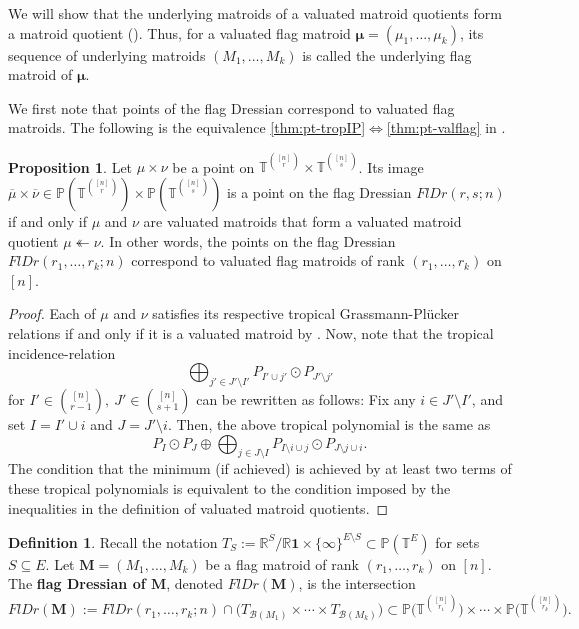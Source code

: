 \documentclass[11pt]{amsart}
\newcommand{\RR}{\mathbb R}
\newcommand{\PP}{\mathbb P}
\newcommand{\TT}{\mathbb T}
\newcommand{\MM}{{\boldsymbol M}}
\theoremstyle{definition}
\newtheorem{prop}[thm]{Proposition}
\newtheorem{defn}[thm]{Definition}
\begin{document}
\medskip
We will show that the underlying matroids of a valuated matroid quotients form a matroid quotient ().  Thus, for a valuated flag matroid $\boldsymbol{\mu} = (\mu_1, \ldots, \mu_k)$, its sequence of underlying matroids $(M_1, \ldots, M_k)$ is called the underlying flag matroid of $\boldsymbol\mu$.

\medskip
We first note that points of the flag Dressian correspond to valuated flag matroids.  The following is the equivalence \ref{thm:pt-tropIP}$\iff$\ref{thm:pt-valflag} in .


\begin{prop}\label{prop:FlDr=valflagmat}
Let $\mu \times \nu$ be a point on $\TT^{\binom{[n]}{r}} \times \TT^{\binom{[n]}{s}}$.  Its image $\overline\mu\times \overline\nu \in \PP(\TT^{\binom{[n]}{r}}) \times \PP(\TT^{\binom{[n]}{s}})$ is a point on the flag Dressian $FlDr(r,s;n)$ if and only if $\mu$ and $\nu$ are valuated matroids that form a valuated matroid quotient $\mu\twoheadleftarrow \nu$.  In other words, the points on the flag Dressian $FlDr(r_1, \ldots, r_k;n)$ correspond to valuated flag matroids of rank $(r_1, \ldots, r_k)$ on $[n]$.
\end{prop}

\begin{proof}
Each of $\mu$ and $\nu$ satisfies its respective tropical Grassmann-Pl\"ucker relations if and only if it is a valuated matroid by .  Now, note that the tropical incidence-relation
\[
\bigoplus_{j' \in J'\setminus I'} P_{I'\cup j'} \odot P_{J' \setminus j'}
\]
for $I'\in \binom{[n]}{r-1},\ J'\in \binom{[n]}{s+1}$
can be rewritten as follows:  Fix any $i\in J'\setminus I'$, and set $I = I'\cup i$ and $J = J'\setminus i$.  Then, the above tropical polynomial is the same as
\[
P_I\odot P_J \oplus \bigoplus_{j \in J\setminus I} P_{I\setminus i \cup j} \odot P_{J\setminus j \cup i}. 
\]
The condition that the minimum (if achieved) is achieved by at least two terms of these tropical polynomials is equivalent to the condition imposed by the inequalities in the definition of valuated matroid quotients.
\end{proof}


\begin{defn}
Recall the notation $T_S := \RR^S/\RR\mathbf 1 \times \{\infty\}^{E\setminus S} \subset \PP(\TT^E)$ for sets $S\subseteq E$.
Let $\MM = (M_1, \ldots, M_k)$ be a flag matroid of rank $(r_1, \ldots, r_k)$ on $[n]$.  The \textbf{flag Dressian of $\MM$}, denoted $FlDr(\MM)$, is the intersection 
% 
\[
FlDr(\MM) := FlDr(r_1, \ldots, r_k;n) \cap \big( T_{\mathcal B(M_1)} \times \cdots \times T_{\mathcal B(M_k)} \big) \subset \PP\big(\TT^{\binom{[n]}{r_1}}\big)\times \cdots \times \PP\big(\TT^{\binom{[n]}{r_k}}\big).
\]
\end{defn}
\end{document}
